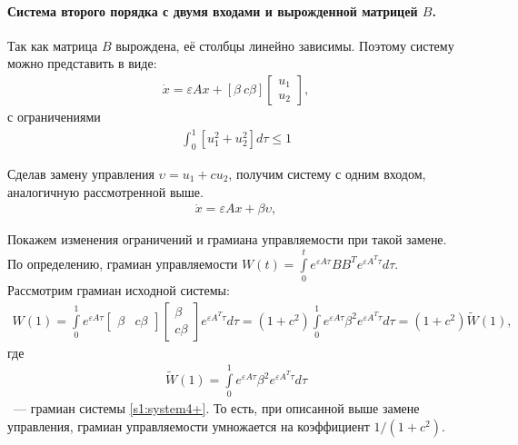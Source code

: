 \documentclass[../main.tex]{subfiles}
\begin{document}
\paragraph{Система второго порядка с двумя входами и вырожденной матрицей $B$.}
Так как матрица $ B $ вырождена, её столбцы линейно зависимы.
Поэтому систему можно представить в виде:
\begin{gather}\label{s1:system4}
 \dot{x} = \varepsilon A x + \left[ \beta \ c\beta \right] {\left[ {\begin{array}{*{20}{c}}
 {{u_1}}\\
 {{u_2}}
 \end{array}} \right]}, 
\end{gather}
с ограничениями 
\begin{gather}\label{s1:contrainsts1}
 \int_{0}^{1} \left[ u_1^2 + u_2^2 \right] d \tau \leqslant 1
\end{gather}
 
Сделав замену управления $ \upsilon = u_1 + c u_2 $, получим систему с одним входом, аналогичную рассмотренной выше.
\begin{gather}\label{s1:system4+}
 \dot{x} = \varepsilon A x + \beta \upsilon, 
\end{gather}
 
Покажем изменения ограничений и грамиана управляемости при такой замене.
По определению, грамиан управляемости $ W(t) = \int \limits_0 ^ t e^{\varepsilon A\tau} B B^T e^{\varepsilon A^T\tau} d\tau $.
Рассмотрим грамиан исходной системы: 
\begin{gather*}
 W(1) = \int \limits_0 ^ 1 e^{\varepsilon A\tau} \left[ \begin{array}{cc}
 \beta & c \beta
 \end{array} \right] \left[ \begin{array}{c}
 \beta
 \\ c \beta 
 \end{array} \right] e^{\varepsilon A^T\tau} d\tau = (1 + c^2) \int \limits_0 ^ 1 e^{\varepsilon A\tau} \beta^2 e^{\varepsilon A^T\tau} d\tau = (1 + c^2) \tilde{W}(1),
\end{gather*}
где 
\begin{gather*}
 \tilde{W}(1) = \int \limits_0 ^ 1 e^{\varepsilon A\tau} \beta^2 e^{\varepsilon A^T\tau} d\tau 
\end{gather*}
~--- грамиан системы \eqref{s1:system4+}.
То есть, при описанной выше замене управления, грамиан управляемости умножается на коэффициент $ 1/(1 + c^2)$.
 
\end{document}
